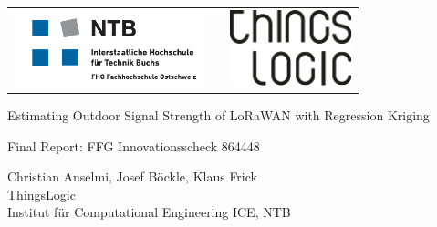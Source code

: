 \thispagestyle{empty}

\pagestyle{scrheadings}
\setlength{\headsep}{1.5cm}					%
\begin{tabularx}{\textwidth}{lXr}
	\includegraphics[height=2.2cm]{figures/NTB-FHO_LOGO_2} & & \includegraphics[height=2.2cm]{figures/logo_thingslogic}
\end{tabularx}

\begin{center}
	\vspace{5cm}
	\textsf{\huge Estimating Outdoor Signal Strength of LoRaWAN with Regression Kriging} \\
	\vspace{0.5cm}	
	{\textsf{\large Final Report: FFG Innovationsscheck 864448} \par}
	\vspace{0.5cm}
	\vspace{1.5cm}
	\textsf{\Large Christian Anselmi, Josef B\"ockle, Klaus Frick } \\
	\vspace{8.5cm}
	\textsf{\Large ThingsLogic} \\
	\textsf{\Large  Institut f\"ur Computational Engineering ICE, NTB} \\
\end{center}
\vspace{2.5cm}






